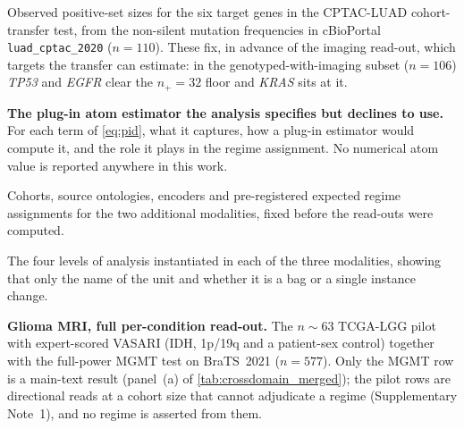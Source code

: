 \begin{table}[htbp]
\centering

\caption{Observed positive-set sizes for the six target genes in the
CPTAC-LUAD cohort-transfer test, from the non-silent mutation frequencies
in cBioPortal \texttt{luad\_cptac\_2020} ($n\!=\!110$). These fix, in
advance of the imaging read-out, which targets the transfer can estimate:
in the genotyped-with-imaging subset ($n\!=\!106$) \textit{TP53} and
\textit{EGFR} clear the $n_+\!=\!32$ floor and \textit{KRAS} sits at it.}
\label{tab:cptac_power}
\end{table}

\begin{table}[htbp]
\centering

\caption{\textbf{The plug-in atom estimator the analysis specifies but
declines to use.} For each term of \cref{eq:pid}, what it captures, how a
plug-in estimator would compute it, and the role it plays in the regime
assignment. No numerical atom value is reported anywhere in this work.}
\label{tab:pid_estimator}
\end{table}

\begin{table}[htbp]
\centering

\caption{Cohorts, source ontologies, encoders and pre-registered expected
regime assignments for the two additional modalities, fixed before the
read-outs were computed.}
\label{tab:crossdomain_protocol}
\end{table}

\begin{table}[htbp]
\centering

\caption{The four levels of analysis instantiated in each of the three
modalities, showing that only the name of the unit and whether it is a bag
or a single instance change.}
\label{tab:levels_crossdomain}
\end{table}

\begin{table}[htbp]
\centering

\caption{\textbf{Glioma MRI, full per-condition read-out.} The
$n\!\sim\!63$ TCGA-LGG pilot with expert-scored VASARI (IDH, 1p/19q and
a patient-sex control) together with the full-power MGMT test on
BraTS~2021 ($n\!=\!577$). Only the MGMT row is a main-text result
(panel~(a) of \cref{tab:crossdomain_merged}); the pilot rows are
directional reads at a cohort size that cannot adjudicate a regime
(Supplementary Note~1), and no regime is asserted from them.}
\label{tab:glioma_domainb}
\end{table}


